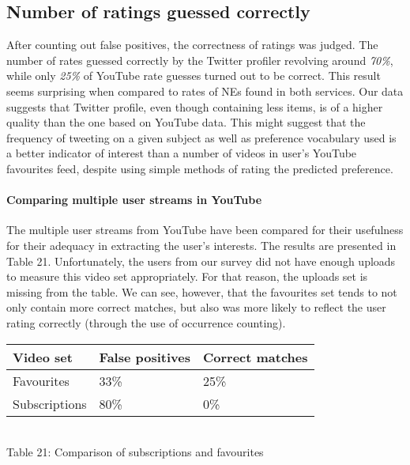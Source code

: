 \subsection{Number of ratings guessed correctly}
\label{sec:evaluation_ratings_correct}
After counting out false positives, the correctness of ratings was judged. The
number of rates guessed correctly by the Twitter profiler revolving around \textit{70\%},
while only \textit{25\%} of YouTube rate guesses turned out to be correct. This
result seems surprising when compared to rates of NEs found in both
services. Our data suggests that Twitter profile, even though containing less
items, is of a higher quality than the one based on YouTube data.  This
might suggest that the frequency of tweeting on a given subject as well as
preference vocabulary used is a better indicator of interest than a number of
videos in user's YouTube favourites feed, despite using simple methods of rating
the predicted preference.

\paragraph{Comparing multiple user streams in YouTube}

The multiple user streams from YouTube have been compared for their usefulness
for their adequacy in extracting the user's interests. The results are presented
in Table 21. Unfortunately, the users from our survey did not have enough
uploads to measure this video set appropriately. For that reason, the uploads
set is missing from the table. We can see, however, that the favourites set
tends to not only contain more correct matches, but also was more likely to
reflect the user rating correctly (through the use of occurrence counting).

\begin{center}
  \begin{tabular}{| l | l | l |}
  Video set & False positives & Correct matches \\ \hline
  Favourites & 33\% & 25\% \\
  Subscriptions & 80\% & 0\% \\
  \end{tabular} \\
  Table 21: Comparison of subscriptions and favourites
\end{center}
